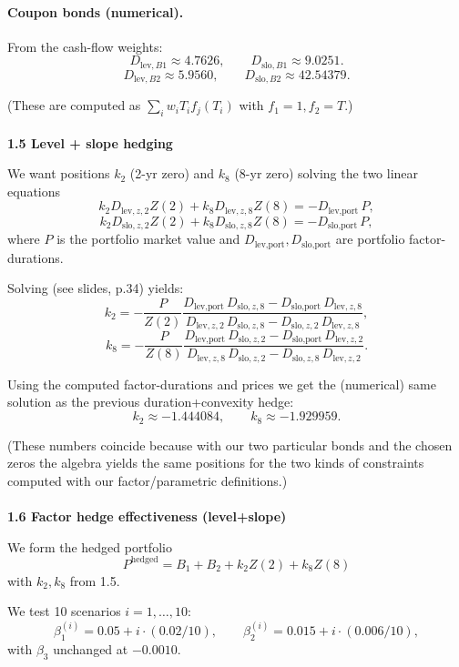 \paragraph{Coupon bonds (numerical).}
From the cash-flow weights:
\[
\boxed{D_{\text{lev},B1} \approx 4.7626,\qquad D_{\text{slo},B1} \approx 9.0251.}
\]
\[
\boxed{D_{\text{lev},B2} \approx 5.9560,\qquad D_{\text{slo},B2} \approx 42.54379.}
\]

(These are computed as \(\sum_i w_i T_i f_j(T_i)\) with \(f_1=1, f_2=T\).)
\\ \\ 
\textbf{1.5 Level + slope hedging}

We want positions \(k_{2}\) (2-yr zero) and \(k_{8}\) (8-yr zero) solving the two linear equations
\[
k_2 D_{\text{lev},z,2} Z(2) + k_8 D_{\text{lev},z,8} Z(8) = -D_{\text{lev,port}}\,P,
\]
\[
k_2 D_{\text{slo},z,2} Z(2) + k_8 D_{\text{slo},z,8} Z(8) = -D_{\text{slo,port}}\,P,
\]
where \(P\) is the portfolio market value and \(D_{\text{lev,port}}, D_{\text{slo,port}}\) are portfolio factor-durations.

Solving (see slides, p.34) yields:
\[
k_{2} = -\frac{P}{Z(2)}\frac{D_{\text{lev,port}} \, D_{\text{slo},z,8} - D_{\text{slo,port}} \, D_{\text{lev},z,8}}{D_{\text{lev},z,2}\, D_{\text{slo},z,8} - D_{\text{slo},z,2}\, D_{\text{lev},z,8}},
\]
\[
k_{8} = -\frac{P}{Z(8)}\frac{D_{\text{lev,port}} \, D_{\text{slo},z,2} - D_{\text{slo,port}} \, D_{\text{lev},z,2}}{D_{\text{lev},z,8}\, D_{\text{slo},z,2} - D_{\text{slo},z,8}\, D_{\text{lev},z,2}}.
\]

Using the computed factor-durations and prices we get the (numerical) same solution as the previous duration+convexity hedge:
\[
\boxed{k_{2} \approx -1.444084,\qquad k_{8} \approx -1.929959.}
\]

(These numbers coincide because with our two particular bonds and the chosen zeros the algebra yields the same positions for the two kinds of constraints computed with our factor/parametric definitions.)
\\ \\ 
\textbf{1.6 Factor hedge effectiveness (level+slope)}

We form the hedged portfolio
\[
P^{\text{hedged}} = B_1 + B_2 + k_2 Z(2) + k_8 Z(8)
\]
with \(k_2,k_8\) from 1.5.

We test 10 scenarios \(i=1,\ldots,10\):
\[
\beta_1^{(i)} = 0.05 + i\cdot(0.02/10),\qquad
\beta_2^{(i)} = 0.015 + i\cdot(0.006/10),
\]
with \(\beta_3\) unchanged at \(-0.0010\).

